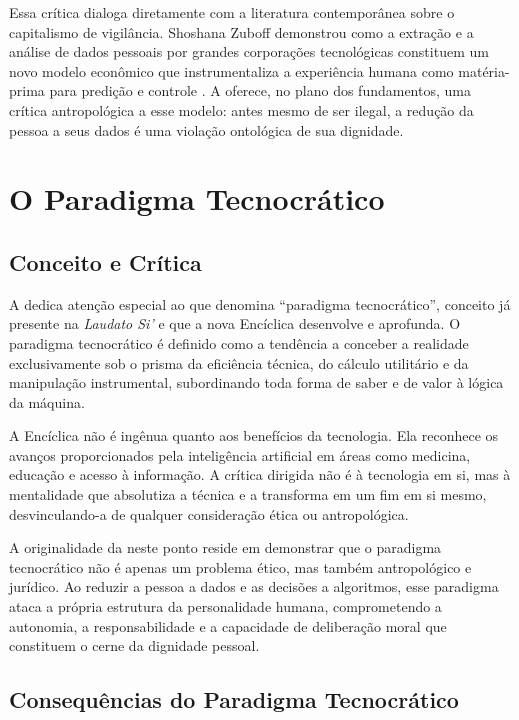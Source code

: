 Essa crítica dialoga diretamente com a literatura contemporânea sobre o capitalismo de vigilância. Shoshana Zuboff demonstrou como a extração e a análise de dados pessoais por grandes corporações tecnológicas constituem um novo modelo econômico que instrumentaliza a experiência humana como matéria-prima para predição e controle \cite{Zuboff2019SC}. A \MH{} oferece, no plano dos fundamentos, uma crítica antropológica a esse modelo: antes mesmo de ser ilegal, a redução da pessoa a seus dados é uma violação ontológica de sua dignidade.

\section{O Paradigma Tecnocrático}
\label{sec:paradigma-tecnocratico}

\subsection{Conceito e Crítica}
\label{subsec:conceito-paradigma}

A \MH{} dedica atenção especial ao que denomina ``paradigma tecnocrático'', conceito já presente na \textit{Laudato Si'} e que a nova Encíclica desenvolve e aprofunda. O paradigma tecnocrático é definido como a tendência a conceber a realidade exclusivamente sob o prisma da eficiência técnica, do cálculo utilitário e da manipulação instrumental, subordinando toda forma de saber e de valor à lógica da máquina.

A Encíclica não é ingênua quanto aos benefícios da tecnologia. Ela reconhece os avanços proporcionados pela inteligência artificial em áreas como medicina, educação e acesso à informação. A crítica dirigida não é à tecnologia em si, mas à mentalidade que absolutiza a técnica e a transforma em um fim em si mesmo, desvinculando-a de qualquer consideração ética ou antropológica.

A originalidade da \MH{} neste ponto reside em demonstrar que o paradigma tecnocrático não é apenas um problema ético, mas também antropológico e jurídico. Ao reduzir a pessoa a dados e as decisões a algoritmos, esse paradigma ataca a própria estrutura da personalidade humana, comprometendo a autonomia, a responsabilidade e a capacidade de deliberação moral que constituem o cerne da dignidade pessoal.

\subsection{Consequências do Paradigma Tecnocrático}
\label{subsec:consequencias-paradigma}

